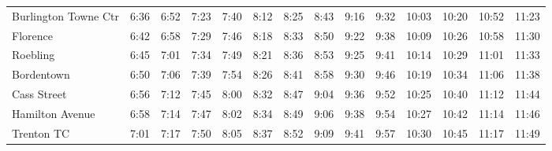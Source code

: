 \begin{center}
\begin{tabular}{@{}lrrrrrrrrrrrrr@{}}
Burlington Towne Ctr & 6:36 & 6:52 & 7:23 & 7:40 & 8:12 & 8:25 & 8:43 & 9:16 & 9:32 & 10:03 & 10:20 & 10:52 & 11:23 \\
Florence & 6:42 & 6:58 & 7:29 & 7:46 & 8:18 & 8:33 & 8:50 & 9:22 & 9:38 & 10:09 & 10:26 & 10:58 & 11:30 \\
Roebling & 6:45 & 7:01 & 7:34 & 7:49 & 8:21 & 8:36 & 8:53 & 9:25 & 9:41 & 10:14 & 10:29 & 11:01 & 11:33 \\
Bordentown & 6:50 & 7:06 & 7:39 & 7:54 & 8:26 & 8:41 & 8:58 & 9:30 & 9:46 & 10:19 & 10:34 & 11:06 & 11:38 \\
Cass Street & 6:56 & 7:12 & 7:45 & 8:00 & 8:32 & 8:47 & 9:04 & 9:36 & 9:52 & 10:25 & 10:40 & 11:12 & 11:44 \\
Hamilton Avenue & 6:58 & 7:14 & 7:47 & 8:02 & 8:34 & 8:49 & 9:06 & 9:38 & 9:54 & 10:27 & 10:42 & 11:14 & 11:46 \\
Trenton TC & 7:01 & 7:17 & 7:50 & 8:05 & 8:37 & 8:52 & 9:09 & 9:41 & 9:57 & 10:30 & 10:45 & 11:17 & 11:49 \\
\bottomrule\end{tabular}\end{center}
